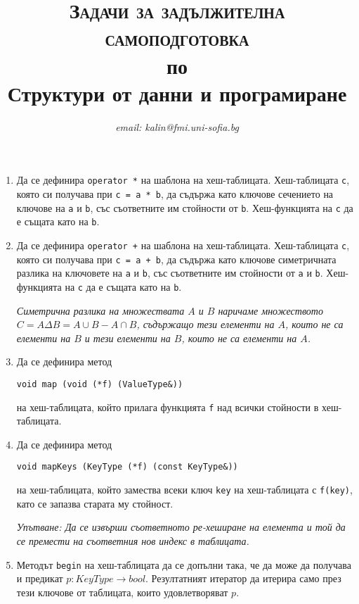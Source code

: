 \documentclass[12pt,a4paper]{article}
\author{\textit{email: kalin@fmi.uni-sofia.bg}}
\title{\textsc{Задачи за задължителна самоподготовка} \\
по \\
Структури от данни и програмиране}
\begin{document}
\maketitle


\begin{enumerate}

	\item Да се дефинира \texttt{operator *} на шаблона на хеш-таблицата. Хеш-таблицата \texttt{c}, която си получава при \texttt{c = a * b}, да съдържа като ключове сечението на ключове на \texttt{a} и \texttt{b}, със съответните им стойности от \texttt{b}. Хеш-функцията на \texttt{c} да е същата като на \texttt{b}.

	\item Да се дефинира \texttt{operator +} на шаблона на хеш-таблицата. Хеш-таблицата \texttt{c}, която си получава при \texttt{c = a + b}, да съдържа като ключове симетричната разлика на ключовете на \texttt{a} и \texttt{b}, със съответните им стойности от \texttt{a} и \texttt{b}. Хеш-функцията на \texttt{c} да е същата като на \texttt{b}.

	\emph{Симетрична разлика на множествата $A$ и $B$ наричаме множеството $C = A \Delta B = A \cup B - A \cap B$, съдържащо тези елементи на $A$, които не са елементи на $B$ и тези елементи на $B$, които не са елементи на $A$.}

	\item Да се дефинира метод 

	\texttt{void map (void (*f) (ValueType\&))} 

	на хеш-таблицата, който прилага функцията \texttt{f} над всички стойности в хеш-таблицата.

	\item Да се дефинира метод 

	\texttt{void mapKeys (KeyType (*f) (const KeyType\&))} 

	на хеш-таблицата, който замества всеки ключ \texttt{key} на хеш-таблицата с \texttt{f(key)}, като се запазва старата му стойност. 

	\emph{Упътване: Да се извърши съответното ре-хеширане на елемента и той да се премести на съответния нов индекс в таблицата.}


	\item Методът \texttt{begin} на хеш-таблицата да се допълни така, че да може да получава и предикат $p:KeyType \rightarrow bool$. Резултатният итератор да итерира само през тези ключове от таблицата, които удовлетворяват $p$.


\end{enumerate}
\end{document}
